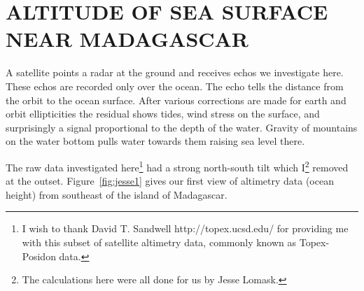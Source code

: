 \begin{comment}
\par
Finally, subroutine \texttt{seastat()} builds a topographic map
from satellite data tracks;
the subroutine uses either of two different statistical assumptions.
The first assumption is that the 2-D prediction-error filter (PEF)
for the topography is Laplace's operator.
The alternate assumption is that a previous map is available
which can be used by \texttt{pef2()} \vpageref{/prog:pef2} to compute the required PEF.
The previous map is presumed to be poor where the tracks are missing.
To put this presumption into practice, we set
the map to zero where there are no data tracks,
so {\tt pef2()} will handle such regions as missing data.
Then we define the template of free parameters with subroutine \texttt{setfree()} \vpageref{/prog:setfree};
and we call subroutine \texttt{pef2()} \vpageref{/prog:pef2} to get the PEF.
With the inputs now all prepared, we invoke subroutine \texttt{seatopo()}.
\progdex{seastat}{topog. statistics}

\end{comment}




\section{ALTITUDE OF SEA SURFACE NEAR MADAGASCAR}

\par
A satellite points a radar at the ground and
receives echos we investigate here.
These echos are recorded only over the ocean.
The echo tells the distance from the orbit to the ocean surface.
After various corrections are made for earth and orbit ellipticities
the residual shows tides, wind stress on the surface,
and surprisingly a signal proportional to the depth of the water.
Gravity of mountains on the water bottom pulls water towards them
raising sea level there.

\par
The raw data investigated here\footnote{
	I wish to thank David T. Sandwell
	http://topex.ucsd.edu/
	for providing me with this subset of satellite altimetry data,
	commonly known as Topex-Posidon data.
	}
had a strong north-south tilt
which I\footnote{
	The calculations here were
	all done for us by Jesse Lomask.
	}
removed at the outset.
Figure~\ref{fig:jesse1} gives our first view of altimetry data
(ocean height) from southeast of the island of
Madagascar.

